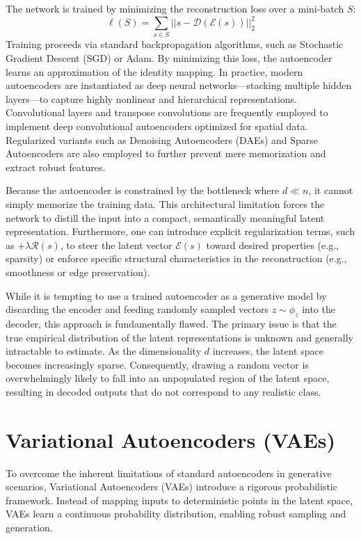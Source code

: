 The network is trained by minimizing the reconstruction loss over a mini-batch $S$:
\begin{equation}
\ell(S) = \sum_{s \in S} ||s - \mathcal{D}(\mathcal{E}(s))||_2^2
\end{equation}
Training proceeds via standard backpropagation algorithms, such as Stochastic Gradient Descent (SGD) or Adam. By minimizing this loss, the autoencoder learns an approximation of the identity mapping. In practice, modern autoencoders are instantiated as deep neural networks—stacking multiple hidden layers—to capture highly nonlinear and hierarchical representations. Convolutional layers and transpose convolutions are frequently employed to implement deep convolutional autoencoders optimized for spatial data. Regularized variants such as Denoising Autoencoders (DAEs) and Sparse Autoencoders are also employed to further prevent mere memorization and extract robust features.

\begin{insightbox}
Because the autoencoder is constrained by the bottleneck where $d \ll n$, it cannot simply memorize the training data. This architectural limitation forces the network to distill the input into a compact, semantically meaningful latent representation. Furthermore, one can introduce explicit regularization terms, such as $+\lambda \mathcal{R}(s)$, to steer the latent vector $\mathcal{E}(s)$ toward desired properties (e.g., sparsity) or enforce specific structural characteristics in the reconstruction (e.g., smoothness or edge preservation).
\end{insightbox}

While it is tempting to use a trained autoencoder as a generative model by discarding the encoder and feeding randomly sampled vectors $z \sim \phi_z$ into the decoder, this approach is fundamentally flawed. The primary issue is that the true empirical distribution of the latent representations is unknown and generally intractable to estimate. As the dimensionality $d$ increases, the latent space becomes increasingly sparse. Consequently, drawing a random vector is overwhelmingly likely to fall into an unpopulated region of the latent space, resulting in decoded outputs that do not correspond to any realistic class.

\section{Variational Autoencoders (VAEs)}
To overcome the inherent limitations of standard autoencoders in generative scenarios, Variational Autoencoders (VAEs) introduce a rigorous probabilistic framework. Instead of mapping inputs to deterministic points in the latent space, VAEs learn a continuous probability distribution, enabling robust sampling and generation.

